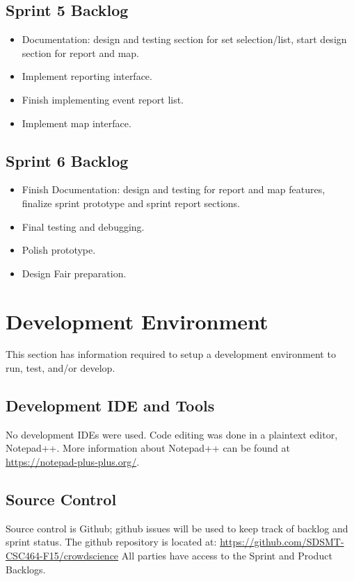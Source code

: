 \subsection{Sprint 5 Backlog}
\begin{itemize}
\itemsep0em
\item Documentation: design and testing section for set selection/list, start design section for report and map.
\item Implement reporting interface.
\item Finish implementing event report list.
\item Implement map interface.
\end{itemize}

\subsection{Sprint 6 Backlog}
\begin{itemize}
\itemsep0em
\item Finish Documentation: design and testing for report and map features, finalize sprint prototype and sprint report sections.
\item Final testing and debugging.
\item Polish prototype.
\item Design Fair preparation.
\end{itemize}


\section{Development Environment}
This section has information required to setup a development environment to run, test, and/or develop. 

\subsection{Development IDE and Tools}
No development IDEs were used. Code editing was done in a plaintext editor, Notepad++. More information about Notepad++ can be found at \url{https://notepad-plus-plus.org/}.

\subsection{Source  Control}
Source control is Github; github issues will be used to keep track of backlog and sprint status. The github repository is located at: \url{https://github.com/SDSMT-CSC464-F15/crowdscience} All parties have access to the Sprint and Product Backlogs.

